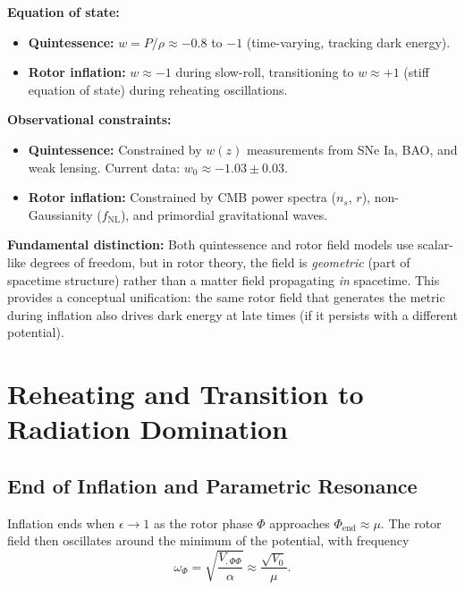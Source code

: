 \documentclass[11pt,a4paper]{article}
\numberwithin{equation}{section}
\theoremstyle{plain}
\theoremstyle{definition}
\theoremstyle{remark}
\begin{document}
\textbf{Equation of state:}
\begin{itemize}
  \item \textbf{Quintessence:} $w = P/\rho \approx -0.8$ to $-1$ (time-varying, tracking dark energy).
  \item \textbf{Rotor inflation:} $w \approx -1$ during slow-roll, transitioning to $w \approx +1$ (stiff equation of state) during reheating oscillations.
\end{itemize}

\textbf{Observational constraints:}
\begin{itemize}
  \item \textbf{Quintessence:} Constrained by $w(z)$ measurements from SNe Ia, BAO, and weak lensing. Current data: $w_0 \approx -1.03 \pm 0.03$.
  \item \textbf{Rotor inflation:} Constrained by CMB power spectra ($n_s$, $r$), non-Gaussianity ($f_{\mathrm{NL}}$), and primordial gravitational waves.
\end{itemize}

\textbf{Fundamental distinction:}
Both quintessence and rotor field models use scalar-like degrees of freedom, but in rotor theory, the field is \emph{geometric} (part of spacetime structure) rather than a matter field propagating \emph{in} spacetime. This provides a conceptual unification: the same rotor field that generates the metric during inflation also drives dark energy at late times (if it persists with a different potential).

\section{Reheating and Transition to Radiation Domination}
\label{sec:reheat}

\subsection{End of Inflation and Parametric Resonance}

Inflation ends when $\epsilon \to 1$ as the rotor phase $\Phi$ approaches $\Phi_{\mathrm{end}} \approx \mu$. The rotor field then oscillates around the minimum of the potential, with frequency
\begin{equation}
\omega_{\Phi} = \sqrt{\frac{V_{,\Phi\Phi}}{\alpha}} \approx \frac{\sqrt{V_0}}{\mu}.
\end{equation}
\end{document}
